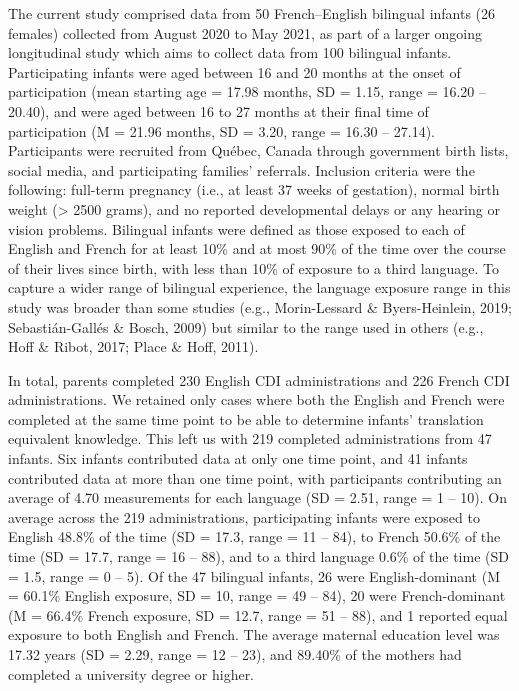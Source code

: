 \documentclass[
  english,
  ,man,floatsintext]{apa6}
\begin{document}
The current study comprised data from 50 French--English bilingual infants (26 females) collected from August 2020 to May 2021, as part of a larger ongoing longitudinal study which aims to collect data from 100 bilingual infants. Participating infants were aged between 16 and 20 months at the onset of participation (mean starting age = 17.98 months, SD = 1.15, range = 16.20 -- 20.40), and were aged between 16 to 27 months at their final time of participation (M = 21.96 months, SD = 3.20, range = 16.30 -- 27.14). Participants were recruited from Québec, Canada through government birth lists, social media, and participating families' referrals. Inclusion criteria were the following: full-term pregnancy (i.e., at least 37 weeks of gestation), normal birth weight (\textgreater{} 2500 grams), and no reported developmental delays or any hearing or vision problems. Bilingual infants were defined as those exposed to each of English and French for at least 10\% and at most 90\% of the time over the course of their lives since birth, with less than 10\% of exposure to a third language. To capture a wider range of bilingual experience, the language exposure range in this study was broader than some studies (e.g., Morin-Lessard \& Byers-Heinlein, 2019; Sebastián-Gallés \& Bosch, 2009) but similar to the range used in others (e.g., Hoff \& Ribot, 2017; Place \& Hoff, 2011).

In total, parents completed 230 English CDI administrations and 226 French CDI administrations. We retained only cases where both the English and French were completed at the same time point to be able to determine infants' translation equivalent knowledge. This left us with 219 completed administrations from 47 infants. Six infants contributed data at only one time point, and 41 infants contributed data at more than one time point, with participants contributing an average of 4.70 measurements for each language (SD = 2.51, range = 1 -- 10). On average across the 219 administrations, participating infants were exposed to English 48.8\% of the time (SD = 17.3, range = 11 -- 84), to French 50.6\% of the time (SD = 17.7, range = 16 -- 88), and to a third language 0.6\% of the time (SD = 1.5, range = 0 -- 5). Of the 47 bilingual infants, 26 were English-dominant (M = 60.1\% English exposure, SD = 10, range = 49 -- 84), 20 were French-dominant (M = 66.4\% French exposure, SD = 12.7, range = 51 -- 88), and 1 reported equal exposure to both English and French. The average maternal education level was 17.32 years (SD = 2.29, range = 12 -- 23), and 89.40\% of the mothers had completed a university degree or higher.
\end{document}
